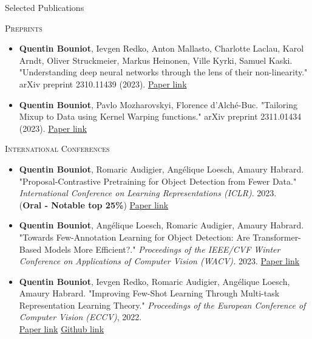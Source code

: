 \documentclass{resume} %
\begin{document}
    \begin{rSection}{Selected Publications}

    \textsc{Preprints}

    \begin{itemize}[label=$\cdot$]
        \item \textbf{Quentin Bouniot}, Ievgen Redko, Anton Mallasto, Charlotte Laclau, Karol Arndt, Oliver Struckmeier, Markus Heinonen, Ville Kyrki, Samuel Kaski. "Understanding deep neural networks through the lens of their non-linearity." arXiv preprint 2310.11439 (2023). \href{https://arxiv.org/abs/2310.11439}{Paper link}
        \item \textbf{Quentin Bouniot}, Pavlo Mozharovskyi, Florence d'Alché-Buc. "Tailoring Mixup to Data using Kernel Warping functions." arXiv preprint 2311.01434 (2023). \href{https://arxiv.org/abs/2311.01434}{Paper link}

    \end{itemize}

    \textsc{International Conferences}

    \begin{itemize}[label=$\cdot$]

        \item \textbf{Quentin Bouniot}, Romaric Audigier, Angélique Loesch, Amaury Habrard. "Proposal-Contrastive Pretraining for Object Detection from Fewer Data." \emph{International Conference on Learning Representations (ICLR)}. 2023. \\ (\textbf{Oral - Notable top 25\%}) \href{https://openreview.net/forum?id=gm0VZ-h-hPy}{Paper link}

        \item \textbf{Quentin Bouniot}, Angélique Loesch, Romaric Audigier, Amaury Habrard. "Towards Few-Annotation Learning for Object Detection: Are Transformer-Based Models More Efficient?." \emph{Proceedings of the IEEE/CVF Winter Conference on Applications of Computer Vision (WACV).} 2023. \href{https://openaccess.thecvf.com/content/WACV2023/html/Bouniot_Towards_Few-Annotation_Learning_for_Object_Detection_Are_Transformer-Based_Models_More_WACV_2023_paper.html}{Paper link}

        \item \textbf{Quentin Bouniot}, Ievgen Redko, Romaric Audigier, Angélique Loesch, Amaury Habrard. "Improving Few-Shot Learning Through Multi-task Representation Learning Theory." \emph{Proceedings of the European Conference of Computer Vision (ECCV)}, 2022. \\ \href{https://arxiv.org/abs/2010.01992}{Paper link} \href{https://github.com/CEA-LIST/MetaMTReg}{Github link}


\end{itemize}
\end{rSection}
\end{document}

